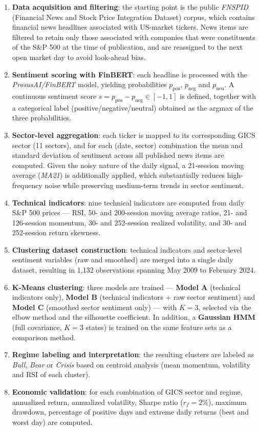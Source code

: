 \begin{enumerate}
  \item \textbf{Data acquisition and filtering}: the starting point is
  the public \textit{FNSPID} (Financial News and Stock Price Integration
  Dataset) corpus, which contains financial news headlines associated
  with US-market tickers. News items are filtered to retain only those
  associated with companies that were constituents of the S\&P 500 at the
  time of publication, and are reassigned to the next open market day to
  avoid look-ahead bias.
  \item \textbf{Sentiment scoring with FinBERT}: each headline is
  processed with the \textit{ProsusAI/FinBERT} model, yielding
  probabilities $p_{\text{pos}}$, $p_{\text{neg}}$ and $p_{\text{neu}}$. A
  continuous sentiment score $s = p_{\text{pos}} - p_{\text{neg}} \in
  [-1,1]$ is defined, together with a categorical label
  (positive/negative/neutral) obtained as the argmax of the three
  probabilities.
  \item \textbf{Sector-level aggregation}: each ticker is mapped to its
  corresponding GICS sector (11 sectors), and for each (date, sector)
  combination the mean and standard deviation of sentiment across all
  published news items are computed. Given the noisy nature of the daily
  signal, a 21-session moving average (\textit{MA21}) is additionally
  applied, which substantially reduces high-frequency noise while
  preserving medium-term trends in sector sentiment.
  \item \textbf{Technical indicators}: nine technical indicators are
  computed from daily S\&P 500 prices --- RSI, 50- and 200-session moving
  average ratios, 21- and 126-session momentum, 30- and 252-session
  realized volatility, and 30- and 252-session return skewness.
  \item \textbf{Clustering dataset construction}: technical indicators and
  sector-level sentiment variables (raw and smoothed) are merged into a
  single daily dataset, resulting in 1,132 observations spanning May 2009
  to February 2024.
  \item \textbf{K-Means clustering}: three models are trained ---
  \textbf{Model A} (technical indicators only), \textbf{Model B}
  (technical indicators + raw sector sentiment) and \textbf{Model C}
  (smoothed sector sentiment only) --- with $K=3$, selected via the elbow
  method and the silhouette coefficient. In addition, a \textbf{Gaussian
  HMM} (full covariance, $K=3$ states) is trained on the same feature sets
  as a comparison method.
  \item \textbf{Regime labeling and interpretation}: the resulting
  clusters are labeled as \emph{Bull}, \emph{Bear} or \emph{Crisis} based
  on centroid analysis (mean momentum, volatility and RSI of each
  cluster).
  \item \textbf{Economic validation}: for each combination of GICS sector
  and regime, annualized return, annualized volatility, Sharpe ratio
  ($r_f=2\%$), maximum drawdown, percentage of positive days and extreme
  daily returns (best and worst day) are computed.
\end{enumerate}

